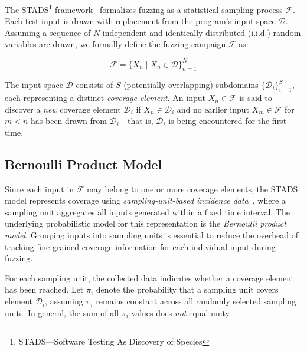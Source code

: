 \documentclass[conference]{IEEEtran}
\begin{document}
The STADS\footnote{STADS—Software Testing As Discovery of Species} framework~\cite{boehme2018stads,boehme2021residual,nguyen2022bedivfuzz,boehme2020boosting} formalizes
fuzzing as a statistical sampling process $\mathcal{F}$. Each test input is drawn with replacement from the program's input space $\pmb{\mathcal{D}}$. Assuming a sequence of $N$ independent and identically distributed (i.i.d.) random variables are drawn, we formally define the fuzzing campaign $\mathcal{F}$ as:

\begin{equation*}
    \mathcal{F}=\{X_n \mid X_n \in \pmb{\mathcal{D}}\}_{n=1}^N
\end{equation*}

The input space $\pmb{\mathcal{D}}$ consists of $S$ (potentially overlapping) subdomains $\{\mathcal{D}_i\}_{i=1}^S$, each representing a distinct \emph{coverage element}. An input $X_n \in \mathcal{F}$ is said to discover a \emph{new} coverage element $\mathcal{D}_i$ if $X_n \in \mathcal{D}_i$ and no earlier input $X_m \in \mathcal{F}$ for $m < n$ has been drawn from $\mathcal{D}_i$—that is, $\mathcal{D}_i$ is being encountered for the first time.


\subsection{Bernoulli Product Model}
Since each input in $\mathcal{F}$ may belong to one or more coverage elements, the STADS model represents coverage using \emph{sampling-unit-based incidence data}~\cite{colwell2012models,chao2017thirty}, where a sampling unit aggregates all inputs generated within a fixed time interval. The underlying probabilistic model for this representation is the \emph{Bernoulli product model}. Grouping inputs into sampling units is essential to reduce the overhead of tracking fine-grained coverage information for each individual input during fuzzing.


For each sampling unit, the collected data indicates whether a coverage element
has been reached. Let $\pi_i$ denote the probability that a sampling unit covers
element $\mathcal{D}_i$, assuming $\pi_i$ remains constant across all randomly
selected sampling units.
In general, the sum of all $\pi_i$ values does \emph{not} equal unity.
\end{document}
